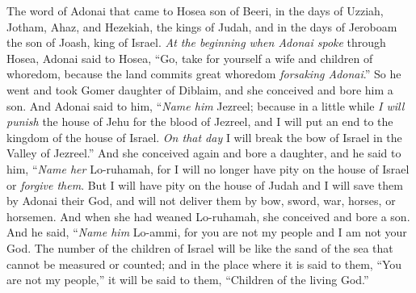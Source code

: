 
\begin{biblechapter} %
 The word of Adonai that came to Hosea son of Beeri, in the days of Uzziah, Jotham, Ahaz, and Hezekiah, the kings of Judah, and in the days of Jeroboam the son of Joash, king of Israel.
\verse \textit{At the beginning when Adonai spoke} through Hosea, 
Adonai said to Hosea, 
“Go, take for yourself a wife and children of whoredom, 
because the land commits great whoredom 
\textit{forsaking Adonai}.”
\verse So he went and took Gomer daughter of Diblaim, 
and she conceived and bore him a son.
\verse And Adonai said to him, 
“\textit{Name him} Jezreel; 
because in a little while \textit{I will punish} the house of Jehu 
for the blood of Jezreel, 
and I will put an end to the kingdom of the house of Israel.
\verse \textit{On that day} 
I will break the bow of Israel 
in the Valley of Jezreel.”
\verse And she conceived again and bore a daughter, and he said to him,
\verse “\textit{Name her} Lo-ruhamah, 
for I will no longer have pity 
on the house of Israel 
or \textit{forgive them}.
\verse But I will have pity on the house of Judah 
and I will save them by Adonai their God, 
and will not deliver them 
by bow, sword, war, 
horses, or horsemen.
\verse And when she had weaned Lo-ruhamah, she conceived and bore a son.
\verse And he said, “\textit{Name him} Lo-ammi, 
for you are not my people 
and I am not your God.
\verse {} The number of the children of Israel 
will be like the sand of the sea 
that cannot be measured or counted; 
and in the place where it is said to them, 
“You are not my people,” 
it will be said to them, 
“Children of the living God.”
\end{biblechapter}

